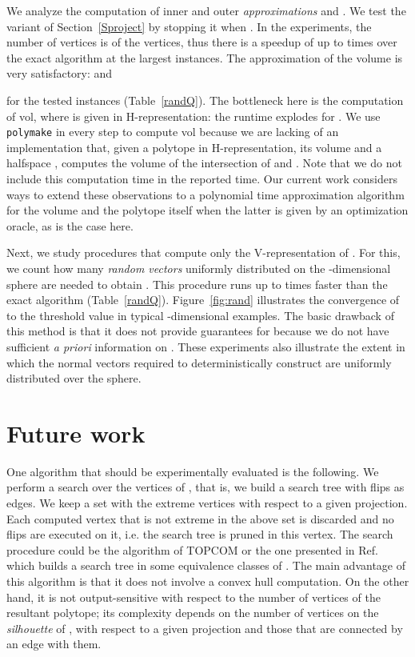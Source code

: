 \documentclass{article}
\newcommand\refcite[1]{\citealp{#1}} \newcommand\citess[1]{\textsuperscript{\textup{\citealp{#1}}}}
\begin{document}
We analyze the computation of inner and
outer \textit{approximations}  and .
We test the variant of Section~\ref{Sproject} by
stopping it when . In the
experiments, the number of  vertices is  of the 
 vertices, thus there is a speedup of up to  times over
the exact algorithm at the largest instances.
The approximation of the volume is very satisfactory:
 and
 
for the tested instances (Table~\ref{randQ}).
The bottleneck here is the computation of
vol, where
 is given in H-representation: the runtime explodes for .
We use 
{\tt polymake} in every step to
compute vol because we are lacking of an implementation that, given a
polytope  in H-representation, its volume and a halfspace , computes the
volume of the intersection of  and .
Note that we do not include this computation time in the reported time.
Our current work considers ways to extend these observations to a polynomial
time approximation algorithm for the volume and the polytope itself when the
latter is given by an optimization oracle, as is the case here.

Next, we study procedures that compute only the V-rep\-re\-sen\-ta\-tion of
.
For this, we count 
how many \textit{random vectors} uniformly distributed on the
-dimensional sphere are needed to obtain
. 
This procedure runs up to  times faster than the exact algorithm
(Table~\ref{randQ}). 
Figure~\ref{fig:rand} illustrates the convergence of
 to the threshold value  in
typical -dimensional examples. 
The basic drawback of this method is that it does not provide guarantees for
 because we do not have sufficient
{\em a priori} information on .
These experiments also illustrate the extent in which
the normal vectors required to deterministically construct 
are uniformly distributed over the sphere.


\section{Future work}

One algorithm that should be experimentally evaluated is the following. 
We perform a search over the vertices of , that is, we build a search
tree with flips as edges. We keep a set with the extreme vertices with respect
to a given projection. Each computed vertex that is not extreme in the above set is
discarded and no flips are executed on it, i.e. the search tree is pruned in
this vertex. The search procedure could be the algorithm of TOPCOM or the one
presented in Ref.~\refcite{MicVer99} which builds a search
tree in some equivalence classes of . The main advantage of this
algorithm is that it does not involve a convex hull computation. On the other
hand, it is not output-sensitive with respect to 
the number of vertices of the resultant polytope;
its complexity depends on the number of vertices on the \emph{silhouette}
of , with respect to a given projection and those that 
are connected by an edge with them.
\end{document}
